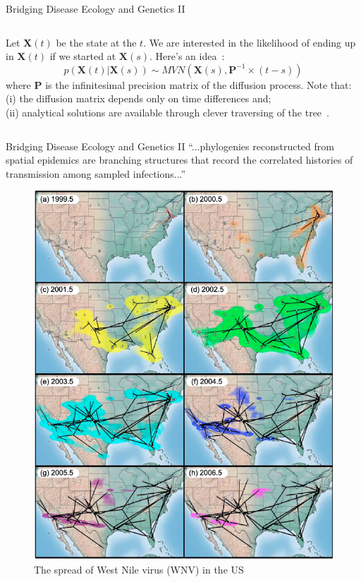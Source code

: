 \begin{frame}{Bridging Disease Ecology and Genetics II}
\begin{columns}
Let $\mathbf{X}(t)$ be the state at the $t$.
We are interested in the likelihood of ending up in $\mathbf{X}(t)$ if we started at $\mathbf{X}(s)$.
Here's an idea~\citep{lemey2010}:
\begin{equation*}
 p(\mathbf{X}(t)|\mathbf{X}(s)) \sim MVN(\mathbf{X}(s), \mathbf{P}^{-1}\times(t-s))
\end{equation*}
where $\mathbf{P}$ is the infinitesimal precision matrix of the diffusion process.
Note that:\\
(i) the diffusion matrix depends only on time differences and;\\
(ii) analytical solutions are available through clever traversing of the tree~\citep{pybus2012}.
\end{columns}
\end{frame}

\begin{frame}{Bridging Disease Ecology and Genetics II}
``...phylogenies reconstructed from spatial epidemics
are branching structures that record the correlated histories of
transmission among sampled infections...''~\citep{pybus2012}
\begin{center}
\begin{figure}
\includegraphics[scale=0.28]{FIGURES/wnv_usa.jpg}
 \caption{\scriptsize The spread of West Nile virus (WNV) in the US~\citep{pybus2012}}
\end{figure}
\end{center}
\end{frame}

